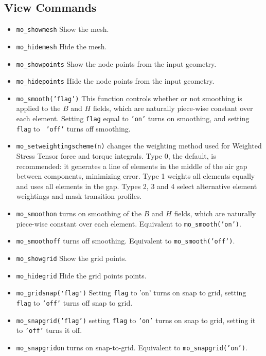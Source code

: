 \subsection{View Commands}
\begin{itemize}
\item{\verb+mo_showmesh+} Show the mesh.
\item{\verb+mo_hidemesh+} Hide the mesh.
\item{\verb+mo_showpoints+} Show the node points from the input geometry.
\item{\verb+mo_hidepoints+} Hide the node points from the input geometry.
\item{\tt mo\_smooth('flag')} This function controls whether or not smoothing
is applied to the $B$ and $H$ fields, which are naturally
piece-wise constant over each element.  Setting {\tt flag} equal to
{\tt 'on'} turns on smoothing, and setting {\tt flag} to {\tt
'off'} turns off smoothing.
\item{\tt mo\_setweightingscheme(n)} changes the weighting method used for Weighted Stress Tensor force and torque integrals. Type 0, the default, is recommended: it generates a line of elements in the middle of the air gap between components, minimizing error. Type 1 weights all elements equally and uses all elements in the gap. Types 2, 3 and 4 select alternative element weightings and mask transition profiles.

\item{\tt mo\_smoothon} turns on smoothing of the $B$ and $H$ fields, which are naturally piece-wise constant over each element. Equivalent to {\tt mo\_smooth('on')}.

\item{\tt mo\_smoothoff} turns off smoothing. Equivalent to {\tt mo\_smooth('off')}.

\item{\verb+mo_showgrid+} Show the grid points.
\item{\verb+mo_hidegrid+} Hide the grid points points.
\item{\verb+mo_gridsnap('flag')+}
Setting {\tt flag} to 'on' turns on snap to grid, setting {\tt
flag} to {\tt 'off'} turns off snap to grid.
\item{\tt mo\_snapgrid('flag')} setting {\tt flag} to {\tt 'on'} turns on snap to grid, setting it to {\tt 'off'} turns it off.

\item{\tt mo\_snapgridon} turns on snap-to-grid. Equivalent to {\tt mo\_snapgrid('on')}.


\end{itemize}
